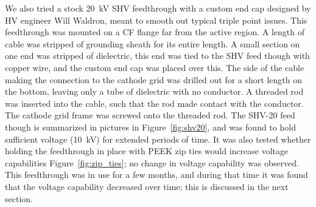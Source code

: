 We also tried a stock 20~kV \ac{SHV} feedthrough with a custom end cap designed by \ac{HV} engineer Will Waldron, meant to smooth out typical triple point issues. This feedthrough was mounted on a CF flange far from the active region. A length of cable was stripped of grounding sheath for its entire length. A small section on one end was stripped of dielectric, this end was tied to the SHV feed though with copper wire, and the custom end cap was placed over this. The side of the cable making the connection to the cathode grid was drilled out for a short length on the bottom, leaving only a tube of dielectric with no conductor. A threaded rod was inserted into the cable, such that the rod made contact with the conductor. The cathode grid frame was screwed onto the threaded rod. The SHV-20 feed though is summarized in pictures in Figure~\ref{fig:shv20}, and was found to hold sufficient voltage (10~kV) for extended periods of time. It was also tested whether holding the feedthrough in place with \ac{PEEK} zip ties would increase voltage capabilities Figure~\ref{fig:zip_ties}; no change in voltage capability was observed. This feedthrough was in use for a few months, and during that time it was found that the voltage capability decreased over time; this is discussed in the next section.

